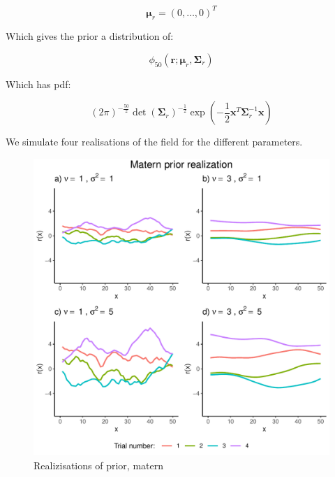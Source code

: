 \documentclass[]{article}
\newcommand{\vect}[1]{\ensuremath{\boldsymbol{\mathbf{#1}}}}
\newcommand{\matr}[1]{\ensuremath{\boldsymbol{\mathbf{#1}}}}
\begin{document}
\begin{equation}
    \vect \mu_r = (0, \dots, 0)^T
\end{equation}

Which gives the prior a distribution of:

\begin{equation}
    \phi_{50}(\vect r ; \vect \mu_r, \matr \Sigma_r)
\end{equation}

Which has pdf:

\begin{equation}
    (2\pi)^{-\frac{50}{2}}\det(\matr \Sigma_r)^{-\frac{1}{2}}\exp\left(-\frac{1}{2}\vect x^T\matr \Sigma_r^{-1}\vect x\right)
\end{equation}

We simulate four realisations of the field for the different parameters.

\begin{figure}

{\centering \includegraphics{Exercise_1_files/figure-latex/fig1b1-1} 

}

\caption{\label{fig:fig1b1} Realizisations of prior, matern}\label{fig:fig1b1}
\end{figure}
\end{document}
